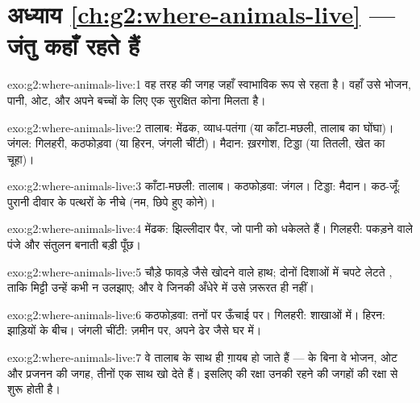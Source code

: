 \section*{अध्याय \ref{ch:g2:where-animals-live} --- जंतु कहाँ रहते हैं}

\begin{solution}{exo:g2:where-animals-live:1}
वह तरह की जगह जहाँ  स्वाभाविक रूप से रहता है। वहाँ उसे भोजन, पानी,
ओट, और अपने बच्चों के लिए एक सुरक्षित कोना मिलता है।
\end{solution}

\begin{solution}{exo:g2:where-animals-live:2}
तालाब: मेंढक, व्याध-पतंगा (या काँटा-मछली, तालाब का घोंघा)। जंगल:
गिलहरी, कठफोड़वा (या हिरन, जंगली चींटी)। मैदान: ख़रगोश, टिड्डा (या
तितली, खेत का चूहा)।
\end{solution}

\begin{solution}{exo:g2:where-animals-live:3}
काँटा-मछली: तालाब। कठफोड़वा: जंगल। टिड्डा: मैदान। कठ-जूँ: पुरानी दीवार
के पत्थरों के नीचे (नम, छिपे हुए कोने)।
\end{solution}

\begin{solution}{exo:g2:where-animals-live:4}
मेंढक: झिल्लीदार पैर, जो पानी को धकेलते हैं। गिलहरी: पकड़ने वाले पंजे
और संतुलन बनाती बड़ी पूँछ।
\end{solution}

\begin{solution}{exo:g2:where-animals-live:5}
चौड़े फावड़े जैसे खोदने वाले हाथ; दोनों दिशाओं में चपटे लेटते ,
ताकि मिट्टी उन्हें कभी न उलझाए; और वे  जिनकी अँधेरे में उसे
ज़रूरत ही नहीं।
\end{solution}

\begin{solution}{exo:g2:where-animals-live:6}
कठफोड़वा: तनों पर ऊँचाई पर। गिलहरी: शाखाओं में। हिरन: झाड़ियों के बीच।
जंगली चींटी: ज़मीन पर, अपने ढेर जैसे घर में।
\end{solution}

\begin{solution}{exo:g2:where-animals-live:7}
वे तालाब के साथ ही ग़ायब हो जाते हैं ---  के बिना वे भोजन, ओट और
प्रजनन की जगह, तीनों एक साथ खो देते हैं। इसलिए  की रक्षा उनकी
रहने की जगहों की रक्षा से शुरू होती है।
\end{solution}


